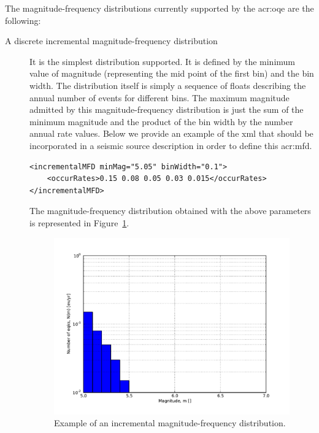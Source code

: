 The magnitude-frequency distributions currently supported by the
\gls{acr:oqe} are the following:

\begin{description}

\item[A discrete incremental magnitude-frequency distribution]
It is the simplest distribution supported. It is defined by the minimum value
of magnitude (representing the mid point of the first bin) and the bin width.
The distribution itself is simply a sequence of floats describing the annual
number of events for different bins. The maximum magnitude admitted by this
magnitude-frequency distribution is just the sum of the minimum magnitude and
the product of the bin width by the number annual rate values. Below we provide an example of the xml that should be incorporated in a
seismic source description in order to define this \gls{acr:mfd}.


\begin{verbatim}
<incrementalMFD minMag="5.05" binWidth="0.1">
    <occurRates>0.15 0.08 0.05 0.03 0.015</occurRates>
</incrementalMFD>
\end{verbatim}

The magnitude-frequency distribution obtained with the above parameters is
represented in Figure~\ref{fig:evenly_discretized_mfd}.

\begin{figure}[!ht]
\centering
\includegraphics[width=12cm]{figures/hazard/ed_mfd.pdf}
\caption{Example of an incremental magnitude-frequency distribution.}
\label{fig:evenly_discretized_mfd}
\end{figure}


\end{description}
